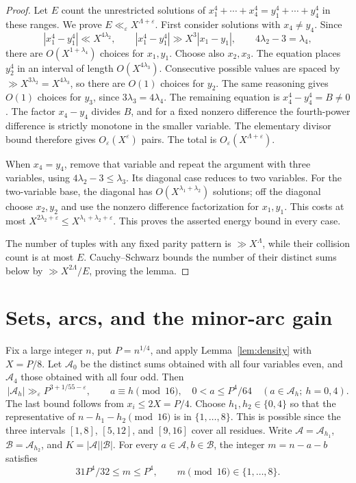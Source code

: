\documentclass[11pt]{article}
\theoremstyle{remark}\newtheorem*{remark}{Remark}
\newcommand{\eps}{\varepsilon}
\begin{document}
\begin{proof}
Let \(E\) count the unrestricted solutions of
\(x_1^4+\cdots+x_4^4=y_1^4+\cdots+y_4^4\) in these ranges.
We prove \(E\ll_\eps X^{\Lambda+\eps}\). First consider solutions
with \(x_4\ne y_4\). Since
\[
 |x_1^4-y_1^4|\ll X^{4\lambda_2},\qquad
 |x_1^4-y_1^4|\gg X^3|x_1-y_1|,
 \qquad4\lambda_2-3=\lambda_4,
\]
there are \(O(X^{1+\lambda_4})\) choices for \(x_1,y_1\).
Choose also \(x_2,x_3\). The equation places \(y_2^4\) in an
interval of length \(O(X^{4\lambda_3})\). Consecutive possible values
are spaced by \(\gg X^{3\lambda_2}=X^{4\lambda_3}\), so there are
\(O(1)\) choices for \(y_2\). The same reasoning gives \(O(1)\)
choices for \(y_3\), since \(3\lambda_3=4\lambda_4\).
The remaining equation is \(x_4^4-y_4^4=B\ne0\). The factor
\(x_4-y_4\) divides \(B\), and for a fixed nonzero difference the
fourth-power difference is strictly monotone in the smaller variable.
The elementary divisor bound therefore gives \(O_\eps(X^\eps)\)
pairs. The total is \(O_\eps(X^{\Lambda+\eps})\).

When \(x_4=y_4\), remove that variable and repeat the argument with
three variables, using \(4\lambda_2-3\le\lambda_3\).
Its diagonal case reduces to two variables. For the two-variable base,
the diagonal has \(O(X^{\lambda_1+\lambda_2})\) solutions;
off the diagonal choose \(x_2,y_2\) and use the nonzero difference
factorization for \(x_1,y_1\). This costs at most
\(X^{2\lambda_2+\eps}\le X^{\lambda_1+\lambda_2+\eps}\).
This proves the asserted energy bound in every case.

The number of tuples with any fixed parity pattern is
\(\gg X^\Lambda\), while their collision count is at most \(E\).
Cauchy--Schwarz bounds the number of their distinct sums below by
\(\gg X^{2\Lambda}/E\), proving the lemma.
\end{proof}

\section{Sets, arcs, and the minor-arc gain}

Fix a large integer \(n\), put \(P=n^{1/4}\), and apply
Lemma~\ref{lem:density} with \(X=P/8\). Let \(\mathcal A_0\)
be the distinct sums obtained with all four variables even, and
\(\mathcal A_4\) those obtained with all four odd. Then
\begin{equation}\label{eq:sets}
 |\mathcal A_h|\gg_\eps P^{3+1/55-\eps},\qquad
 a\equiv h\pmod{16},\quad0<a\le P^4/64
 \quad(a\in\mathcal A_h;\ h=0,4).
\end{equation}
The last bound follows from \(x_i\le2X=P/4\).
Choose \(h_1,h_2\in\{0,4\}\) so that the representative of
\(n-h_1-h_2\pmod{16}\) is in \(\{1,\ldots,8\}\).
This is possible since the three intervals
\([1,8]\), \([5,12]\), and \([9,16]\) cover all residues.
Write \(\mathcal A=\mathcal A_{h_1}\),
\(\mathcal B=\mathcal A_{h_2}\), and \(K=|\mathcal A||\mathcal B|\).
For every \(a\in\mathcal A,b\in\mathcal B\), the integer
\(m=n-a-b\) satisfies
\begin{equation}\label{eq:mrange}
 31P^4/32\le m\le P^4,
 \qquad m\pmod{16}\in\{1,\ldots,8\}.
\end{equation}
\end{document}
